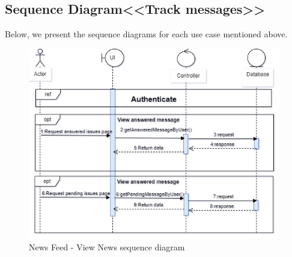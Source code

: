 \subsection{Sequence Diagram<<Track messages>> }
Below, we present the sequence diagrams for each use case mentioned above.

\begin{figure}[H]
   
    
    \includegraphics[width=0.98\textwidth]{images/sprint4/trackMsgSeq.png}
    \caption{News Feed - View News sequence diagram}
    \label{fig:enter-label}
    
\end{figure}
\newpage
